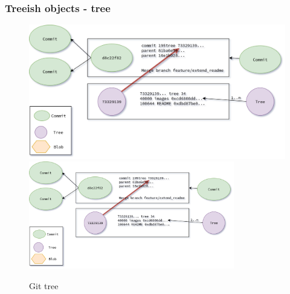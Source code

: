 \begin{frame}[noframenumbering]
    \frametitle{Treeish objects - tree}
    \addtocounter{page}{-1}
    \begin{figure}
        \begin{center}
            {
                \includegraphics[height=0.70\textheight,keepaspectratio]{./images/Treeish_Tree.png}
            }
            {
                \includegraphics[height=0.6\textheight,width=0.8\textwidth]{./images/Treeish_Tree.png}
            }
            \caption{Git tree}
        \end{center}
    \end{figure}
\end{frame}

